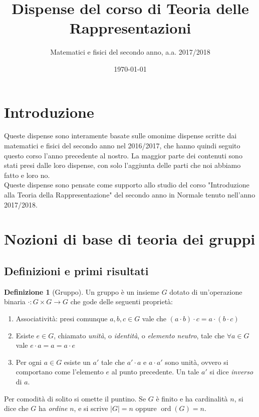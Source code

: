 \documentclass[11pt]{article}
\title{Dispense del corso di Teoria delle Rappresentazioni}
\author{Matematici e fisici del secondo anno, a.a. 2017/2018}
\date{\today}
\theoremstyle{plain}
\theoremstyle{definition}
\newtheorem{defn}{Definizione}[section]
\theoremstyle{remark}
\DeclareMathOperator{\ord}{ord}
\begin{document}
\maketitle
\tableofcontents

\newpage
\section*{Introduzione}
Queste dispense sono interamente basate sulle omonime dispense scritte dai matematici e fisici del secondo anno nel 2016/2017, che hanno quindi seguito questo corso l'anno precedente al nostro. La maggior parte dei contenuti sono stati presi dalle loro dispense, con solo l'aggiunta delle parti che noi abbiamo fatto e loro no.\\
Queste dispense sono pensate come supporto allo studio del corso "Introduzione alla Teoria della Rappresentazione" del secondo anno in Normale tenuto nell'anno 2017/2018.


\newpage
\section{Nozioni di base di teoria dei gruppi}

\subsection{Definizioni e primi risultati}

\begin{defn}[Gruppo] Un gruppo è un insieme $G$ dotato di un'operazione binaria $\cdot : G\times G \to G$ che gode delle seguenti proprietà:
\begin{enumerate}
	\item Associatività: presi comunque $a,b,c\in G$ vale che $(a\cdot b)\cdot c = a\cdot(b\cdot c)$
	\item Esiste $e\in G$, chiamato \emph{unità}, o \emph{identità}, o \emph{elemento neutro}, tale che $\forall a\in G$ vale $e\cdot a = a = a\cdot e$
	\item Per ogni $a\in G$ esiste un $a'$ tale che $a'\cdot a$ e $a\cdot a'$ sono unità, ovvero si comportano come l'elemento $e$ al punto precedente.
		  Un tale $a'$ si dice \emph{inverso} di $a$.
\end{enumerate}
Per comodità di solito si omette il puntino. Se $G$ è finito e ha cardinalità $n$, si dice che $G$ ha \emph{ordine} $n$,
e si scrive $|G|=n$ oppure $\ord(G)=n$.
\end{defn}
\end{document}
